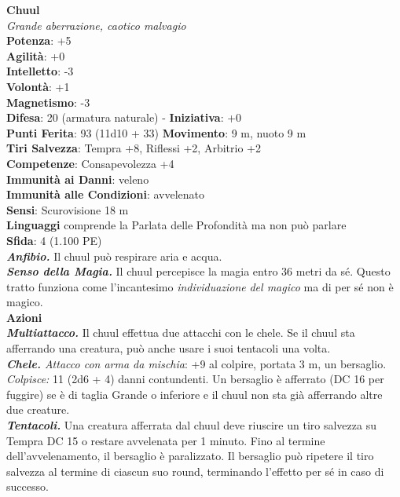 \begin{multicols}{2}
\medskip\textbf{Chuul}\\
\emph{Grande aberrazione, caotico malvagio}\\
\textbf{Potenza}: +5\\
\textbf{Agilità}: +0\\
\textbf{Intelletto}: -3\\
\textbf{Volontà}: +1\\
\textbf{Magnetismo}: -3\\
\textbf{Difesa}: 20 (armatura naturale) - \textbf{Iniziativa}: +0\\
\textbf{Punti Ferita}: 93 (11d10 + 33)
\textbf{Movimento}: 9 m, nuoto 9 m\\
\textbf{Tiri Salvezza}: Tempra +8, Riflessi +2, Arbitrio +2\\
\textbf{Competenze}: Consapevolezza +4\\
\textbf{Immunità ai Danni}: veleno\\
\textbf{Immunità alle Condizioni}: avvelenato\\
\textbf{Sensi}: Scurovisione 18 m\\
\textbf{Linguaggi} comprende la Parlata delle Profondità ma non può parlare\\
\textbf{Sfida}: 4 (1.100 PE)\smallskip\\
\emph{\textbf{Anfibio.}} Il chuul può respirare aria e acqua.\\
\emph{\textbf{Senso della Magia.}} Il chuul percepisce la magia entro 36 metri da sé. Questo tratto funziona come l'incantesimo \emph{individuazione} \emph{del magico} ma di per sé non è magico.\\
\smallskip\textbf{Azioni}\\
\emph{\textbf{Multiattacco.}} Il chuul effettua due attacchi con le chele. Se il chuul sta afferrando una creatura, può anche usare i suoi tentacoli una volta.\\
\emph{\textbf{Chele.} Attacco con arma da mischia}: +9 al colpire, portata 3 m, un bersaglio.\\
\emph{Colpisce:} 11 (2d6 + 4) danni contundenti. Un bersaglio è afferrato (DC  16 per fuggire) se è di taglia Grande o inferiore e il chuul non sta già afferrando altre due creature.\\
\emph{\textbf{Tentacoli.}} Una creatura afferrata dal chuul deve riuscire un tiro salvezza su Tempra DC  15 o restare avvelenata per 1 minuto. Fino al termine dell'avvelenamento, il bersaglio è paralizzato. Il bersaglio può ripetere il tiro salvezza al termine di ciascun suo round, terminando l'effetto per sé in caso di successo.\\

\end{multicols}
